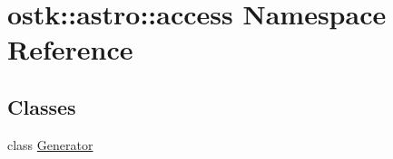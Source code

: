 \hypertarget{namespaceostk_1_1astro_1_1access}{}\section{ostk\+:\+:astro\+:\+:access Namespace Reference}
\label{namespaceostk_1_1astro_1_1access}
\subsection*{Classes}
\begin{DoxyCompactItemize}
\item 
class \hyperlink{classostk_1_1astro_1_1access_1_1_generator}{Generator}
\end{DoxyCompactItemize}
